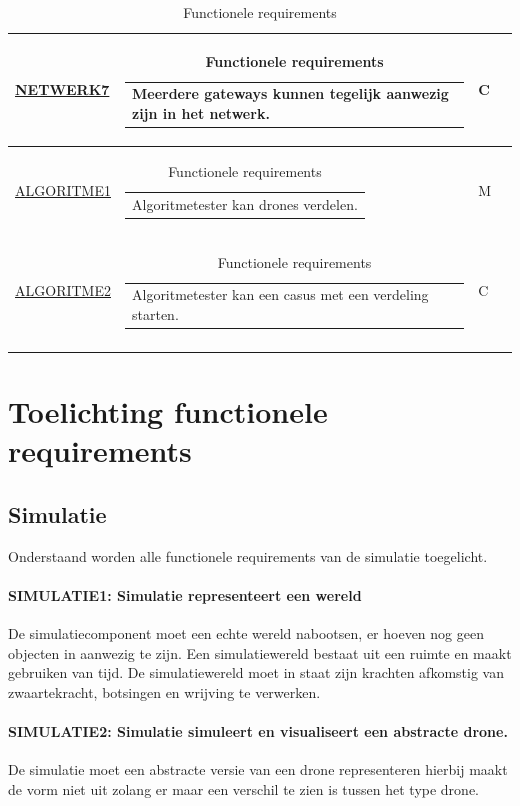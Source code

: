\documentclass[a4paper, 11pt, oneside]{report}
\begin{document}
\begin{longtable}{|l|l|l|l|}
	\hyperlink{NETWERK7}{NETWERK7}	&\begin{tabular}[c]{@{}l@{}}Meerdere gateways kunnen tegelijk aanwezig zijn in het netwerk. \end{tabular}			 					 &C \\ \hline	
	\hyperlink{ALGORITME1}{ALGORITME1}		&\begin{tabular}[c]{@{}l@{}}Algoritmetester kan drones verdelen. \end{tabular}		 					 &M \\ \hline	
	\hyperlink{ALGORITME2}{ALGORITME2}		&\begin{tabular}[c]{@{}l@{}}Algoritmetester kan een casus met een verdeling starten. \end{tabular}		 					 &C \\ \hline	
	\caption{Functionele requirements}
	\label{tab:criteria}
\end{longtable}

\section{Toelichting functionele requirements}

\subsection{Simulatie}
Onderstaand worden alle functionele requirements van de simulatie toegelicht.
\paragraph{SIMULATIE1: Simulatie representeert een wereld}
\hypertarget{SIMULATIE1}{}

De simulatiecomponent moet een echte wereld nabootsen, er hoeven nog geen objecten in aanwezig te zijn.
Een simulatiewereld bestaat uit een ruimte en maakt gebruiken van tijd. 
De simulatiewereld moet in staat zijn krachten afkomstig van zwaartekracht, botsingen en wrijving te verwerken. 

\paragraph{SIMULATIE2: Simulatie simuleert en visualiseert een abstracte drone.}
\hypertarget{SIMULATIE2}{}

De simulatie moet een abstracte versie van een drone representeren hierbij maakt de vorm niet uit zolang er maar een verschil te zien is tussen het type drone.
\end{document}
